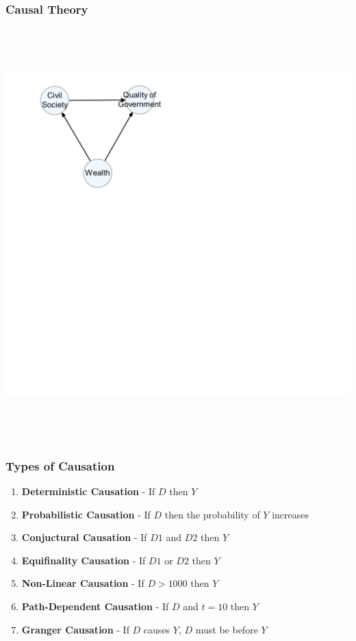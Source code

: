 \documentclass[xcolor=x11names,compress]{beamer}\usepackage[]{graphicx}\usepackage[]{color}
\newenvironment{knitrout}{}{} %
\renewcommand{\(}{\begin{columns}}
\renewcommand{\)}{\end{columns}}
\newcommand{\<}[1]{\begin{column}{#1}}
\renewcommand{\>}{\end{column}}
\begin{document}
\begin{frame}
\frametitle{Causal Theory}
\begin{knitrout}
\color{fgcolor}

{\centering \includegraphics[width=600,height=600]{figure/unnamed-chunk-3-1} 

}



\end{knitrout}
\end{frame}

\begin{frame}
\frametitle{Types of Causation}
\begin{enumerate}
\item \textbf{Deterministic Causation} - If $D$ then $Y$
\pause
\item \textbf{Probabilistic Causation} - If $D$ then the probability of $Y$ increases
\pause
\item \textbf{Conjuctural Causation} - If $D1$ and $D2$ then $Y$
\pause
\item \textbf{Equifinality Causation} - If $D1$ or $D2$ then $Y$
\pause
\item \textbf{Non-Linear Causation} - If $D>1000$ then $Y$
\pause
\item \textbf{Path-Dependent Causation} - If $D$ and $t=10$ then $Y$
\pause
\item \textbf{Granger Causation} - If $D$ causes $Y$, $D$ must be before $Y$
\end{enumerate}
\end{frame}
\end{document}
